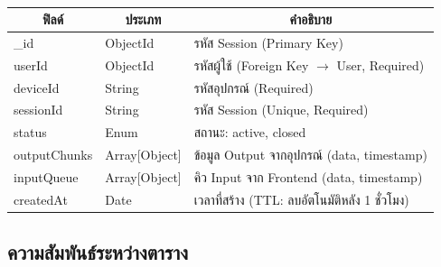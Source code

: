 
\begin{table}[H]
    \caption{}
    \label{tab:shell-session-structure}
    \fontSixTeen 
    \begin{tabularx}{\textwidth}{|l|l|X|} 
        \hline
        \multicolumn{1}{|c|}{\textbf{ฟิลด์}} & \multicolumn{1}{c|}{\textbf{ประเภท}} & \multicolumn{1}{c|}{\textbf{คำอธิบาย}} \\
        \hline
        \_id & ObjectId & รหัส Session (Primary Key) \\
        \hline
        userId & ObjectId & รหัสผู้ใช้ (Foreign Key $\rightarrow$ User, Required) \\
        \hline
        deviceId & String & รหัสอุปกรณ์ (Required) \\
        \hline
        sessionId & String & รหัส Session (Unique, Required) \\
        \hline
        status & Enum & สถานะ: active, closed \\
        \hline
        outputChunks & Array[Object] & ข้อมูล Output จากอุปกรณ์ (data, timestamp) \\
        \hline
        inputQueue & Array[Object] & คิว Input จาก Frontend (data, timestamp) \\
        \hline
        createdAt & Date & เวลาที่สร้าง (TTL: ลบอัตโนมัติหลัง 1 ชั่วโมง) \\
        \hline
    \end{tabularx}
\end{table}


\subsection{ความสัมพันธ์ระหว่างตาราง}

